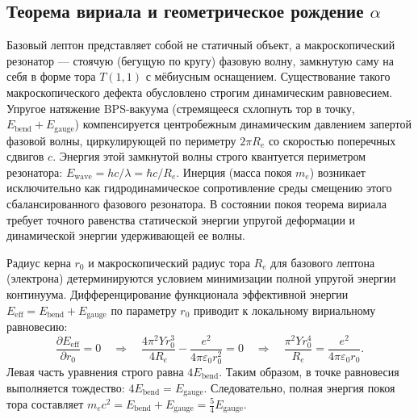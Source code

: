 \documentclass[11pt,a4paper]{article}
\begin{document}
	\subsection{Теорема вириала и геометрическое рождение $\alpha$}
	Базовый лептон представляет собой не статичный объект, а макроскопический резонатор — стоячую (бегущую по кругу) фазовую волну, замкнутую саму на себя в форме тора $T(1,1)$ с мёбиусным оснащением.
	Существование такого макроскопического дефекта обусловлено строгим динамическим равновесием. Упругое натяжение BPS-вакуума (стремящееся схлопнуть тор в точку, $E_{\text{bend}} + E_{\text{gauge}}$) компенсируется центробежным динамическим давлением запертой фазовой волны, циркулирующей по периметру $2\pi R_e$ со скоростью поперечных сдвигов $c$. Энергия этой замкнутой волны строго квантуется периметром резонатора: $E_{\text{wave}} = hc / \lambda = \hbar c / R_e$.
	Инерция (масса покоя $m_e$) возникает исключительно как гидродинамическое сопротивление среды смещению этого сбалансированного фазового резонатора. В состоянии покоя теорема вириала требует точного равенства статической энергии упругой деформации и динамической энергии удерживающей ее волны.
	
	Радиус керна $r_0$ и макроскопический радиус тора $R_e$ для базового лептона (электрона) детерминируются условием минимизации полной упругой энергии континуума. 
	Дифференцирование функционала эффективной энергии $E_{\text{eff}} = E_{\text{bend}} + E_{\text{gauge}}$ по параметру $r_0$ приводит к локальному вириальному равновесию:
	\begin{equation}
		\frac{\partial E_{\text{eff}}}{\partial r_0} = 0 \quad \Longrightarrow \quad \frac{4 \pi^2 Y r_0^3}{4R_e} - \frac{e^2}{4\pi\varepsilon_0 r_0^2} = 0 \quad \Longrightarrow \quad \frac{\pi^2 Y r_0^4}{R_e} = \frac{e^2}{4\pi\varepsilon_0 r_0}.
	\end{equation}
	Левая часть уравнения строго равна $4 E_{\text{bend}}$. Таким образом, в точке равновесия выполняется тождество: $4 E_{\text{bend}} = E_{\text{gauge}}$. 
	Следовательно, полная энергия покоя тора составляет $m_e c^2 = E_{\text{bend}} + E_{\text{gauge}} = \frac{5}{4} E_{\text{gauge}}$. 
	
\end{document}
